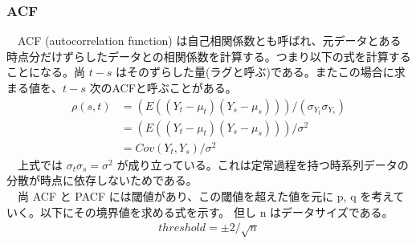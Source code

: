 \documentclass{scrartcl}
\begin{document}
\subsubsection{ACF}
\label{sec:orgf2068da}
　ACF (autocorrelation function) は自己相関係数とも呼ばれ、元データとある時点分だけずらしたデータとの相関係数を計算する。つまり以下の式を計算することになる。尚 \(t-s\) はそのずらした量(ラグと呼ぶ)である。またこの場合に求まる値を、\(t-s\) 次のACFと呼ぶことがある。\\
\begin{align}
\rho(s,t) &= (E((Y_t - \mu_t)(Y_s-\mu_s)))/(\sigma_{Y_t}\sigma_{Y_s}) \nonumber \\
&= (E((Y_t - \mu_t)(Y_s-\mu_s)))/\sigma^2 \nonumber \\
&= Cov(Y_t, Y_s)/\sigma^2
\end{align}
　上式では \(\sigma_t\sigma_s = \sigma^2\) が成り立っている。これは定常過程を持つ時系列データの分散が時点に依存しないためである。\\
　尚 ACF と PACF には閾値があり、この閾値を超えた値を元に p, q を考えていく。以下にその境界値を求める式を示す。 但し n はデータサイズである。\\
\begin{align}
threshold = \pm 2/\sqrt{n}
\end{align}
\end{document}
